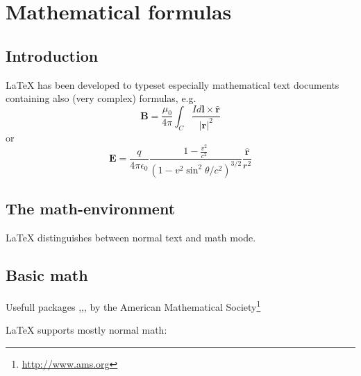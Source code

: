 \section{Mathematical formulas}
\subsection{Introduction}
\begin{frame}
	\LaTeX{} has been developed to typeset especially mathematical text
	documents containing also (very complex) formulas, e.g.
	$$ \mathbf{B} = \frac{\mu_0}{4\pi}\int_C \frac{I d\mathbf{l} \times \mathbf{\hat r}}{|\mathbf{r}|^2} $$
	or
	$$ \mathbf{E} = \frac{q}{4\pi \epsilon_0} \frac{1-\frac{v^2}{c^2}}{(1-v^2\sin^2\theta/c^2)^{3/2}}\frac{\mathbf{\hat	r}}{r^2}$$
\end{frame}

\subsection{The math-environment}
\begin{frame}
	\LaTeX{} distinguishes between normal text and math mode.

\end{frame}
\begin{frame}
\end{frame}
\begin{frame}
\end{frame}

\subsection{Basic math}
\begin{frame}
	\begin{block}{Usefull packages}
		,,, 
	by the American Mathematical Society\footnote{\url{http://www.ams.org}}
	\end{block}
\end{frame}
\begin{frame}
	\LaTeX{} supports mostly normal math:
\end{frame}
\begin{frame}
\end{frame}
\begin{frame}
\end{frame}


